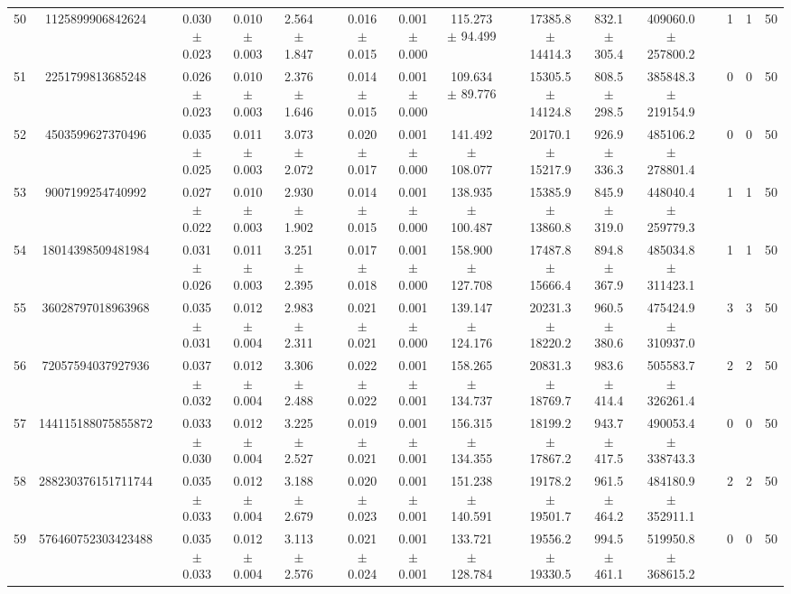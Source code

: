 \documentclass[11pt]{article}
\begin{document}
\begin{landscape}
\begin{table}
\begin{tabular}{cccccccccccccccccc}
50 & 1125899906842624 &&  0.030 $\pm$ 0.023 & 0.010 $\pm$ 0.003 & 2.564 $\pm$ 1.847 &&  0.016 $\pm$ 0.015 & 0.001 $\pm$ 0.000 & 115.273 $\pm$ 94.499 &&  17385.8 $\pm$ 14414.3 & 832.1 $\pm$ 305.4 & 409060.0 $\pm$ 257800.2 && 1& 1& 50\\
51 & 2251799813685248 &&  0.026 $\pm$ 0.023 & 0.010 $\pm$ 0.003 & 2.376 $\pm$ 1.646 &&  0.014 $\pm$ 0.015 & 0.001 $\pm$ 0.000 & 109.634 $\pm$ 89.776 &&  15305.5 $\pm$ 14124.8 & 808.5 $\pm$ 298.5 & 385848.3 $\pm$ 219154.9 && 0& 0& 50\\
52 & 4503599627370496 &&  0.035 $\pm$ 0.025 & 0.011 $\pm$ 0.003 & 3.073 $\pm$ 2.072 &&  0.020 $\pm$ 0.017 & 0.001 $\pm$ 0.000 & 141.492 $\pm$ 108.077 &&  20170.1 $\pm$ 15217.9 & 926.9 $\pm$ 336.3 & 485106.2 $\pm$ 278801.4 && 0& 0& 50\\
53 & 9007199254740992 &&  0.027 $\pm$ 0.022 & 0.010 $\pm$ 0.003 & 2.930 $\pm$ 1.902 &&  0.014 $\pm$ 0.015 & 0.001 $\pm$ 0.000 & 138.935 $\pm$ 100.487 &&  15385.9 $\pm$ 13860.8 & 845.9 $\pm$ 319.0 & 448040.4 $\pm$ 259779.3 && 1& 1& 50\\
54 & 18014398509481984 &&  0.031 $\pm$ 0.026 & 0.011 $\pm$ 0.003 & 3.251 $\pm$ 2.395 &&  0.017 $\pm$ 0.018 & 0.001 $\pm$ 0.000 & 158.900 $\pm$ 127.708 &&  17487.8 $\pm$ 15666.4 & 894.8 $\pm$ 367.9 & 485034.8 $\pm$ 311423.1 && 1& 1& 50\\
55 & 36028797018963968 &&  0.035 $\pm$ 0.031 & 0.012 $\pm$ 0.004 & 2.983 $\pm$ 2.311 &&  0.021 $\pm$ 0.021 & 0.001 $\pm$ 0.000 & 139.147 $\pm$ 124.176 &&  20231.3 $\pm$ 18220.2 & 960.5 $\pm$ 380.6 & 475424.9 $\pm$ 310937.0 && 3& 3& 50\\
56 & 72057594037927936 &&  0.037 $\pm$ 0.032 & 0.012 $\pm$ 0.004 & 3.306 $\pm$ 2.488 &&  0.022 $\pm$ 0.022 & 0.001 $\pm$ 0.001 & 158.265 $\pm$ 134.737 &&  20831.3 $\pm$ 18769.7 & 983.6 $\pm$ 414.4 & 505583.7 $\pm$ 326261.4 && 2& 2& 50\\
57 & 144115188075855872 &&  0.033 $\pm$ 0.030 & 0.012 $\pm$ 0.004 & 3.225 $\pm$ 2.527 &&  0.019 $\pm$ 0.021 & 0.001 $\pm$ 0.001 & 156.315 $\pm$ 134.355 &&  18199.2 $\pm$ 17867.2 & 943.7 $\pm$ 417.5 & 490053.4 $\pm$ 338743.3 && 0& 0& 50\\
58 & 288230376151711744 &&  0.035 $\pm$ 0.033 & 0.012 $\pm$ 0.004 & 3.188 $\pm$ 2.679 &&  0.020 $\pm$ 0.023 & 0.001 $\pm$ 0.001 & 151.238 $\pm$ 140.591 &&  19178.2 $\pm$ 19501.7 & 961.5 $\pm$ 464.2 & 484180.9 $\pm$ 352911.1 && 2& 2& 50\\
59 & 576460752303423488 &&  0.035 $\pm$ 0.033 & 0.012 $\pm$ 0.004 & 3.113 $\pm$ 2.576 &&  0.021 $\pm$ 0.024 & 0.001 $\pm$ 0.001 & 133.721 $\pm$ 128.784 &&  19556.2 $\pm$ 19330.5 & 994.5 $\pm$ 461.1 & 519950.8 $\pm$ 368615.2 && 0& 0& 50\\

\end{tabular}
\end{table}
\end{landscape}
\end{document}
